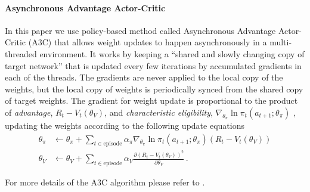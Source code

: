 \documentclass[letterpaper]{article} %
\newtheorem{defn}{Definition}
\def\act{a}
\def\acttn{\act_{t+1}}
\def\Value{V}
\def\pit{\pi_t}
\begin{document}
\paragraph{Asynchronous Advantage Actor-Critic}
\def\charelig{\nabla_{\theta_\pi}\ln \pit(\acttn; \theta_\pi)}
In this paper we use policy-based method called Asynchronous Advantage Actor-Critic (A3C) \cite{MnBaMiICML2016} that allows weight updates to happen asynchronously in a multi-threaded environment.
It works by keeping a ``shared and slowly changing copy of target network'' that is updated every few iterations by accumulated gradients in each of the threads.
The gradients are never applied to the local copy of the weights, but the local copy of weights is periodically synced from the shared copy of target weights.
The gradient for weight update is proportional to the product of \emph{advantage}, $R_t - \Value_t(\theta_\Value)$, and \emph{characteristic eligibility}, $\charelig$ \cite{WiML1992}, updating the weights according to the following update equations
\begin{align}
  \theta_\pi &\leftarrow \theta_\pi
  + \sum_{t \in \text{episode}}\alpha_\pi \charelig (R_t - \Value_t(\theta_\Value))
  \\
  \theta_\Value &\leftarrow \theta_\Value
  + \sum_{t \in \text{episode}} \alpha_\Value \frac{\partial (R_t - \Value_t(\theta_\Value))^2}
                  {\partial\theta_\Value}
                  \, .
\end{align}

For more details of the A3C algorithm please refer to \cite{MnBaMiICML2016}.



\end{document}
